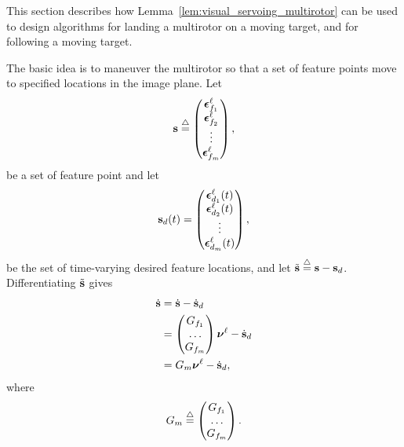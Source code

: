 This section describes how Lemma~\ref{lem:visual_servoing_multirotor} can be used to design algorithms for landing a multirotor on a moving target, and for following a moving target.

The basic idea is to maneuver the multirotor so that a set of feature points move to specified locations in the image plane.  Let 
\begin{equation}\label{eq:visual_servoing_sbf}
\sbf \defeq \begin{pmatrix}
\epsilonbf_{f_1}^\ell \\
\epsilonbf_{f_2}^\ell \\
\vdots \\
\epsilonbf_{f_m}^\ell
\end{pmatrix},
\end{equation}
be a set of feature point and let 
\begin{equation}\label{eq:visual_servoing_sbf_d}
\sbf_d(t) = \begin{pmatrix}
\epsilonbf_{d_1}^{\ell}(t) \\
\epsilonbf_{d_2}^{\ell}(t) \\
\vdots \\
\epsilonbf_{d_m}^{\ell}(t)
\end{pmatrix},
\end{equation}
be the set of time-varying desired feature locations, and let $\tilde{\mathbf{s}} \stackrel{\triangle}{=} \mathbf{s} - \mathbf{s}_d$.  Differentiating $\tilde{\mathbf{s}}$ gives
\begin{align*}
\dot{\mathbf{s}} &= \dot{\mathbf{s}} - \dot{\mathbf{s}}_d \\
		   &= \begin{pmatrix} G_{f_1} \\ \dots \\ G_{f_m} \end{pmatrix} \boldsymbol{\nu}^\ell - \dot{\mathbf{s}}_d \\
		   &= G_m \boldsymbol{\nu}^\ell - \dot{\mathbf{s}}_d,
\end{align*}
where 
\[
G_m \stackrel{\triangle}{=} \begin{pmatrix} G_{f_1} \\ \dots \\ G_{f_m} \end{pmatrix}.
\]

